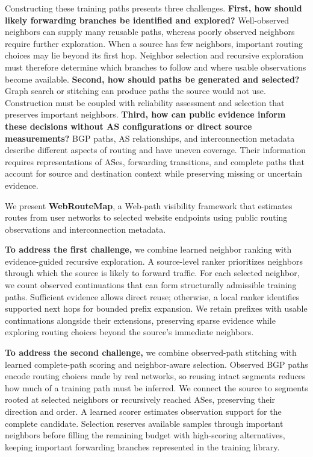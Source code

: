 \documentclass[sigconf,anonymous,review]{acmart}
\newcommand{\sys}{\mbox{WebRouteMap}\xspace}
\begin{document}
Constructing these training paths presents three challenges.
\textbf{First, how should likely forwarding branches be identified and
explored?} Well-observed neighbors can supply many reusable paths, whereas
poorly observed neighbors require further exploration. When a source has
few neighbors, important routing choices may lie beyond its first hop.
Neighbor selection and recursive exploration must therefore determine
which branches to follow and where usable observations become available.
\textbf{Second, how should paths be generated and selected?} Graph search
or stitching can produce paths the source would not use. Construction must
be coupled with reliability assessment and selection that preserves
important neighbors.
\textbf{Third, how can public evidence inform these decisions without AS
configurations or direct source measurements?} BGP paths, AS relationships,
and interconnection metadata describe different aspects of routing and have
uneven coverage. Their information requires representations of ASes,
forwarding transitions, and complete paths that account for source and
destination context while preserving missing or uncertain evidence.

We present \textbf{\sys}, a Web-path visibility framework that estimates
routes from user networks to selected website endpoints using public routing
observations and interconnection metadata.

\textbf{To address the first challenge,} we combine learned neighbor
ranking with evidence-guided recursive exploration. A source-level ranker
prioritizes neighbors through which the source is likely to forward
traffic. For each selected neighbor, we count observed continuations that
can form structurally admissible training paths. Sufficient evidence
allows direct reuse; otherwise, a local ranker identifies supported next
hops for bounded prefix expansion. We retain prefixes with usable
continuations alongside their extensions, preserving sparse evidence
while exploring routing choices beyond the source's immediate neighbors.

\textbf{To address the second challenge,} we combine observed-path
stitching with learned complete-path scoring and neighbor-aware selection.
Observed BGP paths encode routing choices made by real networks, so
reusing intact segments reduces how much of a training path must be
inferred. We connect the source to segments rooted at selected neighbors
or recursively reached ASes, preserving their direction and order. A
learned scorer estimates observation support for the complete candidate.
Selection reserves available samples through important neighbors before
filling the remaining budget with high-scoring alternatives, keeping
important forwarding branches represented in the training library.
\end{document}
